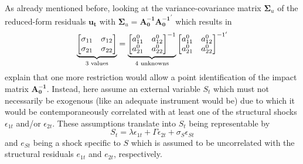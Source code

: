 \documentclass[a4paper,11pt,listof=nochaptergap,oneside,pointednumbers,bibtotoc,bigheadings,liststotoc]{scrbook}
\theoremstyle{mysatz}
\theoremstyle{mydefinition}
\theoremstyle{mytheorem}
\theoremstyle{mybemerkung}
\newcommand{\vect}[1]{\boldsymbol{\mathbf{#1}}}
\begin{document}
As already mentioned before, looking at the variance-covariance matrix $\vect{\Sigma}_u$ of the reduced-form residuals $\vect{u_t}$ with $\vect{\Sigma}_u = \vect{A_{0}^{-1}} \vect{A_{0}^{-1}}^'$ which results in 
$$		
		\underbrace{%
		\begin{bmatrix}
    		\sigma_{11} & \sigma_{12} \\
		\sigma_{21} & \sigma_{22}
 		\end{bmatrix}
}_{\text{3 values}} = \underbrace{%
		\begin{bmatrix}
    		a_{11}^0 & a_{12}^0 \\
		a_{21}^0 & a_{22}^0
 		\end{bmatrix}^{-1}
}_{\text{4 unknowns}}
\begin{bmatrix}
    		a_{11}^0 & a_{12}^0  \\
		a_{21}^0 & a_{22}^0
 		\end{bmatrix}^{{-1}'}$$
\citet{ludvigsonetal:17} explain that one more restriction would allow a point identification of the impact matrix $ \vect{A_{0}^{-1}}$. Instead, here \citet{ludvigsonetal:17} assume an external variable $S_t$ which must not necessarily be exogenous (like an adequate instrument would be) due to which it would be contemporaneously correlated with at least one of the structural shocks $\epsilon_{1t}$ and/or $\epsilon_{2t}$. These assumptions translate into $S_t$ being representable by 
	\begin{equation} \label{eq:svar_ludvig1}
	S_t = \lambda \epsilon_{1t} + \Gamma \epsilon_{2t} + \sigma_S \epsilon_{St}							
	\end{equation}	
and $e_{St}$ being a shock specific to $S$ which is assumed to be uncorrelated with the structural residuals $e_{1t}$ and $e_{2t}$, respectively. 
\end{document}
